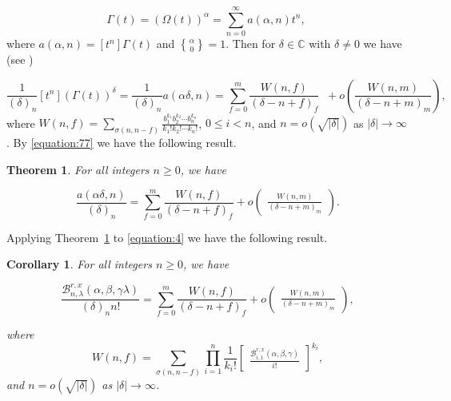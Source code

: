\documentclass[12pt]{amsart}
\newtheorem{proof 1}{proof 1}
\newtheorem{theorem}{Theorem}[section]
\newtheorem{corollary}{Corollary}[section]
\begin{document}
\begin{equation}
	\Gamma(t)=(\Omega(t))^\alpha=\sum_{n=0}^\infty a(\alpha,n)t^n,\;
\end{equation} where $a(\alpha,n)=[t^n]\Gamma(t)$ and ${\alpha\brace 0}=1$. Then for $\delta\in \mathbb{C}$ with $\delta\not=0$ we have (see \cite{hsu1990power,hsu1991kind})


\begin{equation}\label{equation:77}\frac{1}{(\delta)_n}\left[t^n\right]\left(\Gamma(t)\right)^{\delta}=\frac{1}{(\delta)_n}a(\alpha\delta,n)=\sum_{f=0}^m\frac{W(n,f)}{(\delta-n+f)_f}\;\;+o\left(\frac{W(n,m)}{(\delta-n+m)_m}\right),\end{equation}
where $W(n,f)=\sum\limits_{\sigma(n,n-f)}\frac{b_1^{k_1}b_2^{k_2}\cdots b_n^{k_n}}{k_1!k_2!\cdots k_n!}$, $0\leq i<n$,  and $n=o(\sqrt{|\delta|})$ as  $|\delta|\rightarrow \infty$. By \eqref{equation:77} we have the following result. 


\begin{theorem}\label{theorem:30}\cite{hsu1990power,hsu1991kind} For all integers $n\geq0$, we have
	
	
	\begin{equation}
		\frac{a(\alpha\delta,n)}{(\delta)_n}=\sum\limits_{f=0}^m\frac{W(n,f)}{(\delta-n+f)_f}+o\begin{pmatrix}
			\frac{W(n,m)}{(\delta-n+m)_m}
		\end{pmatrix}.
	\end{equation}
	\end{theorem}

Applying Theorem~\ref{theorem:30} to \eqref{equation:4} we have the following result. 
\begin{corollary}\label{theorem:200} For all integers $n\geq0$, we have
	
	
	\begin{equation}
		\frac{\mathcal{B}^{r,x}_{n,\lambda}(\alpha,\beta,\gamma\lambda)}{(\delta)_nn!}=\sum\limits_{f=0}^m\frac{W(n,f)}{(\delta-n+f)_f}+o\begin{pmatrix}
			\frac{W(n,m)}{(\delta-n+m)_m}
		\end{pmatrix},
	\end{equation}
	
	\noindent	where \begin{equation}\label{equation:200}W(n,f)=\sum\limits_{\sigma(n,n-f)}\prod\limits_{i=1}^n\frac{1}{k_i!}\begin{bmatrix}
			\frac{\mathcal{B}^{r,x}_{i,1}(\alpha,\beta,\gamma)}{i!}
		\end{bmatrix}^{k_i},\end{equation} and $n=o(\sqrt{|\delta|})$ as  $|\delta|\rightarrow \infty$.
	
\end{corollary}
\end{document}
